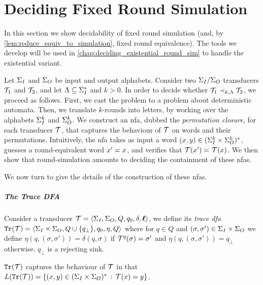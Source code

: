 \chapter{Deciding Fixed Round Simulation}
\label{chap:deciding_fixed_round_sim}

In this section we show decidability of fixed round simulation (and, by \autoref{lem:reduce_equiv_to_simulation}, fixed round equivalence). The tools we develop will be used in \autoref{chap:deciding_existential_round_sim} to handle the existential variant.

Let $\Sigma_{I}$ and $\Sigma_{O}$ be input and output alphabets. Consider two $\Sigma_{I}/\Sigma_{O}$ transducers $\mathcal{T}_1$ and $\mathcal{T}_2$, and let $\Lambda\subseteq \Sigma_{I}^*$ and $k>0$.
In order to decide whether $\mathcal{T}_1\prec_{k,\Lambda} \mathcal{T}_2$, we proceed as follows. First, we cast the problem to a problem about deterministic automata. Then, we translate $k$-rounds into letters, by working over the alphabets $\Sigma_{I}^k$ and $\Sigma_{O}^k$. We construct an \gls{nfa}, dubbed the \emph{permutation closure}, for each transducer $\mathcal{T}$, that captures the behaviour of $\mathcal{T}$ on words and their permutations. Intuitively, the \gls{nfa} takes as input a word $(x,y)\in (\Sigma_{I}^{k}\times \Sigma_{O}^k)^*$, guesses a round-equivalent word $x'\asymp_{} x$, and verifies that $\mathcal{T}(x')\asymp_{} \mathcal{T}(x)$. We then show that round-simulation amounts to deciding the containment of these \glspl{nfa}.

We now turn to give the details of the construction of these \glspl{nfa}.

\paragraph{The Trace \bf DFA} Consider a transducer $\mathcal{T}=\left< \Sigma_{I},\Sigma_{O},Q,q_0,\delta,\boldsymbol{\ell}\right>$, we define its \emph{trace \gls{dfa}} ${\mathtt{Tr}}(\mathcal{T})=\left< \Sigma_{I}\times\Sigma_{O},Q\cup\{q_{\bot}\},q_0,\eta,Q\right>$ where for $q\in Q$ and $(\sigma,\sigma')\in \Sigma_{I}\times \Sigma_{O}$ we define $\eta(q,(\sigma,\sigma'))=\delta(q,\sigma)$ if $\mathcal{T}^{q}(\sigma)=\sigma'$ and $\eta(q,(\sigma,\sigma'))=q_{\bot}$ otherwise.
$q_\bot$ is a rejecting sink. 

${\mathtt{Tr}}(\mathcal{T})$ captures the behaviour of $\mathcal{T}$ in that $L({\mathtt{Tr}}(\mathcal{T}))=\{(x,y)\in (\Sigma_{I}\times \Sigma_{O})^*\, :\, \mathcal{T}(x)=y\}$. 

